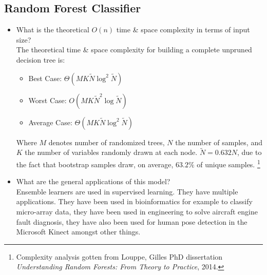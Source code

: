 \documentclass[twoside,openright,titlepage,numbers=noenddot,headinclude,%
               footinclude=true,cleardoublepage=empty,abstractoff,BCOR=5mm,%
               paper=a4,fontsize=11pt,ngerman,american]{scrreprt}
\numberwithin{theorem}{chapter}
\numberwithin{definition}{chapter}
\numberwithin{algorithm}{chapter}
\numberwithin{figure}{chapter}
\numberwithin{table}{chapter}
\numberwithin{equation}{chapter}
\begin{document}
\subsection*{Random Forest Classifier}
\begin{itemize} 
\item What is the theoretical $O(n)$ time \& space complexity in terms of input size?\\
The theoretical time \& space complexity for building a complete unpruned decision tree is:
\begin{itemize} 
\item Best Case: $\Theta(MK\widetilde{N}\log^2 \widetilde{N})$ 
\item Worst Case: $O(MK\widetilde{N}^2\log \widetilde{N})$ 
\item Average Case: $\Theta(MK\widetilde{N}\log^2 \widetilde{N})$
\end{itemize}
Where $M$ denotes number of randomized trees, $N$ the number of samples, and $K$ the number of variables randomly drawn at each node. $\widetilde{N} = 0.632 N$, due to the fact that bootstrap samples draw, on average, $63.2\%$ of unique samples. 
\footnote{Complexity analysis gotten from Louppe, Gilles PhD dissertation \textit{Understanding Random Forests: From Theory to Practice}, 2014.}

\item What are the general applications of this model?\\
Ensemble learners are used in supervised learning. They have multiple applications. They have been used in bioinformatics for example to classify micro-array data, they have been used in engineering to solve aircraft engine fault diagnosis, they have also been used for human pose detection in the Microsoft Kinect amongst other things. \\ 


\end{itemize}
\end{document}
